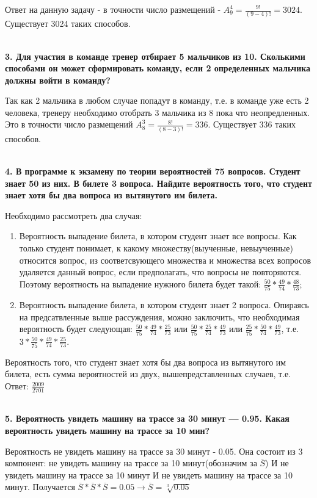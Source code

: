 \documentclass{article}
\begin{document}
Ответ на данную задачу - в точности число размещений - $A^{4}_{9} = \frac{9!}{(9 - 4)!} = 3024$.
Существует 3024 таких способов.

\textbf{\\3. Для участия в команде тренер отбирает 5 мальчиков из 10. Сколькими способами он может сформировать команду, если 2 определенных мальчика должны войти в команду?}

Так как 2 мальчика в любом случае попадут в команду, т.е. в команде уже есть 2 человека, тренеру необходимо отобрать 3 мальчика из 8 пока что неопредленных. Это  в точности число размещений $A^{3}_{8} = \frac{8!}{(8 - 3)!} = 336$.
Существует 336 таких способов.

\textbf{\\4. В программе к экзамену по теории вероятностей 75 вопросов. Студент знает 50 из них. В билете 3 вопроса. Найдите вероятность того, что студент знает хотя бы два вопроса из вытянутого им билета.}

Необходимо рассмотреть два случая:
\begin{enumerate}
\item Вероятность выпадение билета, в котором студент знает все вопросы. Как только студент понимает, к какому множеству(выученные, невыученные) относится вопрос, из соответсвующего множества и множества всех вопросов удаляется данный вопрос, если предполагать, что вопросы не повторяются. Поэтому вероятность на выпадение нужного билета будет такой: $\frac{50}{75}*\frac{49}{74}*\frac{48}{73}$;
\item Вероятность выпадение билета, в котором студент знает 2 вопроса. Опираясь на предсатвленные выше рассуждения, можно заключить, что необходимая вероятность будет следующая: $\frac{50}{75}*\frac{49}{74}*\frac{25}{73}$ или $\frac{50}{75}*\frac{25}{74}*\frac{49}{73}$ или $\frac{25}{75}*\frac{50}{74}*\frac{49}{73}$, т.е. $3*\frac{50}{75}*\frac{49}{74}*\frac{25}{73}$.
\end{enumerate}

Вероятность того, что студент знает хотя бы два вопроса из вытянутого им билета, есть сумма вероятностей из двух, вышепредставленных случаев, т.е.
Ответ: $\frac{2009}{2701}$

\textbf{\\5. Вероятность увидеть машину на трассе за 30 минут — 0.95. Какая вероятность увидеть машину на трассе за 10 мин? }

Вероятность не увидеть машину на трассе за 30 минут - 0.05. Она состоит из 3 компонент: не увидеть машину на трассе за 10 минут(обозначим за $\overline{S}$) И не увидеть машину на трассе за 10 минут И не увидеть машину на трассе за 10 минут. Получается $\overline{S} * \overline{S} * \overline{S} = 0.05 \rightarrow \overline{S} = \sqrt[3]{0.05}$ 
\end{document}
